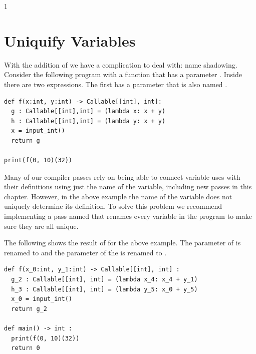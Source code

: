 \documentclass[7x10,nocrop]{TimesAPriori_MIT}%
\def\racketEd{0}
\def\pythonEd{1}
\def\edition{0}
\newcommand{\racket}[1]{{\if\edition\racketEd{#1}\fi}}
\newcommand{\python}[1]{{\if\edition\pythonEd #1\fi}}
\begin{document}
\if\edition\pythonEd
\section{Uniquify Variables}
\label{sec:uniquify-lambda}

With the addition of  we have a complication to deal
with: name shadowing. Consider the following program with a function
 that has a parameter . Inside  there are two
 expressions. The first  has a parameter
that is also named .

\begin{lstlisting}
def f(x:int, y:int) -> Callable[[int], int]:
  g : Callable[[int],int] = (lambda x: x + y)
  h : Callable[[int],int] = (lambda y: x + y)
  x = input_int()
  return g

print(f(0, 10)(32))
\end{lstlisting}

Many of our compiler passes rely on being able to connect variable
uses with their definitions using just the name of the variable,
including new passes in this chapter. However, in the above example
the name of the variable does not uniquely determine its
definition. To solve this problem we recommend implementing a pass
named  that renames every variable in the program to
make sure they are all unique.

The following shows the result of  for the above
example. The  parameter of  is renamed to 
and the  parameter of the  is renamed to
.

\begin{lstlisting}
def f(x_0:int, y_1:int) -> Callable[[int], int] :
  g_2 : Callable[[int], int] = (lambda x_4: x_4 + y_1)
  h_3 : Callable[[int], int] = (lambda y_5: x_0 + y_5)
  x_0 = input_int()
  return g_2

def main() -> int :
  print(f(0, 10)(32))
  return 0
\end{lstlisting}

\fi


\end{document}
